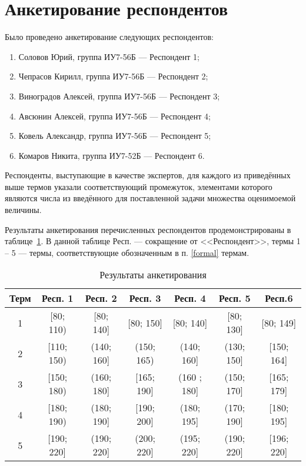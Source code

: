 \section{Анкетирование респондентов}

Было проведено анкетирование следующих респондентов:
\begin{enumerate}[label=\arabic*)]
	\item Соловов Юрий, группа ИУ7-56Б --- Респондент 1;
	\item Чепрасов Кирилл, группа ИУ7-56Б --- Респондент 2;
	\item Виноградов Алексей, группа ИУ7-56Б --- Респондент 3;
	\item Авсюнин Алексей, группа ИУ7-56Б --- Респондент 4;
	\item Ковель Александр, группа ИУ7-56Б --- Респондент 5;
	\item Комаров Никита, группа ИУ7-52Б --- Респондент 6.
\end{enumerate}

Респонденты, выступающие в качестве экспертов, для каждого из приведённых выше термов указали соответствующий промежуток, элементами которого являются числа из введённого для поставленной задачи множества оценимоемой величины.

Результаты анкетирования перечисленных респондентов продемонстрированы в таблице~\ref{tbl:anket}. В данной таблице Респ. --- сокращение от <<Респондент>>, термы 1 -- 5 --- термы, соответствующие обозначенным в п. \ref{formal} термам.

\begin{center}
	\captionsetup{justification=raggedright,singlelinecheck=off}
	\begin{longtable}[c]{|c|c|c|c|c|c|c|}
		\caption{Результаты анкетирования\label{tbl:anket}}\\ \hline
		Терм & Респ. 1 & Респ. 2 & Респ. 3  & Респ. 4 & Респ. 5 & Респ.6 \\ \hline
		1 &   [80; 110) &   [80; 140] & [80; 150]  & [80; 140] & [80; 130] & [80; 149] \\ \hline
		2 &   [110; 150) &   (140; 160] & (150; 165) & (140; 160] &  (130; 150] & [150; 164]\\ \hline
		3&   [150; 180) &   (160; 180] & [165; 190] & (160 ; 180]  & (150; 170] & [165; 179]\\ \hline
		4 &   [180; 190) &  (180; 190] & [190; 200] & (180; 195] & (170; 190] & [180; 195]\\ \hline
		5 &   [190; 220]  &  (190; 220] & (200; 220] & (195; 220] &  (190; 220] & [196; 220]\\ \hline
	\end{longtable}
\end{center}

